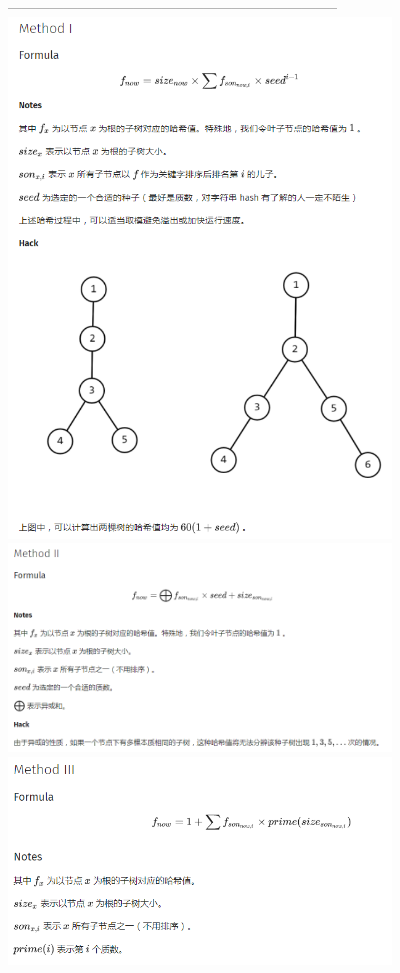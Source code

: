 ﻿-----------------------------------------------------------------------\\
\includegraphics[width=4in]{tree_hash1.png}\\
\includegraphics[width=4in]{tree_hash2.png}\\
\includegraphics[width=4in]{tree_hash3.png}\\
